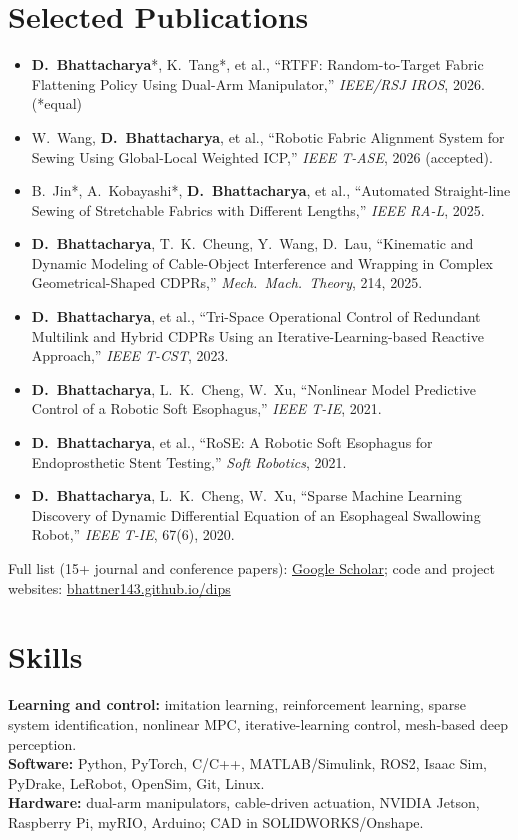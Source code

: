 \documentclass[10pt,a4paper]{article}
\newcommand{\pub}[1]{\item #1}
\begin{document}
\section*{Selected Publications}
\small
\begin{itemize}[itemsep=0.15em]
  \pub{\textbf{D.~Bhattacharya}*, K.~Tang*, et al., ``RTFF: Random-to-Target Fabric Flattening Policy Using Dual-Arm Manipulator,'' \textit{IEEE/RSJ IROS}, 2026. (*equal)}
  \pub{W.~Wang, \textbf{D.~Bhattacharya}, et al., ``Robotic Fabric Alignment System for Sewing Using Global-Local Weighted ICP,'' \textit{IEEE T-ASE}, 2026 (accepted).}
  \pub{B.~Jin*, A.~Kobayashi*, \textbf{D.~Bhattacharya}, et al., ``Automated Straight-line Sewing of Stretchable Fabrics with Different Lengths,'' \textit{IEEE RA-L}, 2025.}
  \pub{\textbf{D.~Bhattacharya}, T.~K.~Cheung, Y.~Wang, D.~Lau, ``Kinematic and Dynamic Modeling of Cable-Object Interference and Wrapping in Complex Geometrical-Shaped CDPRs,'' \textit{Mech.\ Mach.\ Theory}, 214, 2025.}
  \pub{\textbf{D.~Bhattacharya}, et al., ``Tri-Space Operational Control of Redundant Multilink and Hybrid CDPRs Using an Iterative-Learning-based Reactive Approach,'' \textit{IEEE T-CST}, 2023.}
  \pub{\textbf{D.~Bhattacharya}, L.~K.~Cheng, W.~Xu, ``Nonlinear Model Predictive Control of a Robotic Soft Esophagus,'' \textit{IEEE T-IE}, 2021.}
  \pub{\textbf{D.~Bhattacharya}, et al., ``RoSE: A Robotic Soft Esophagus for Endoprosthetic Stent Testing,'' \textit{Soft Robotics}, 2021.}
  \pub{\textbf{D.~Bhattacharya}, L.~K.~Cheng, W.~Xu, ``Sparse Machine Learning Discovery of Dynamic Differential Equation of an Esophageal Swallowing Robot,'' \textit{IEEE T-IE}, 67(6), 2020.}
\end{itemize}
\normalsize
Full list (15+ journal and conference papers): \href{https://scholar.google.com/citations?user=4BBRfsMAAAAJ\&hl=en}{Google Scholar}; code and project websites: \href{https://bhattner143.github.io/dips/}{bhattner143.github.io/dips}

\section*{Skills}
\textbf{Learning and control:} imitation learning, reinforcement learning, sparse system identification, nonlinear MPC, iterative-learning control, mesh-based deep perception.\\
\textbf{Software:} Python, PyTorch, C/C++, MATLAB/Simulink, ROS2, Isaac Sim, PyDrake, LeRobot, OpenSim, Git, Linux.\\
\textbf{Hardware:} dual-arm manipulators, cable-driven actuation, NVIDIA Jetson, Raspberry Pi, myRIO, Arduino; CAD in SOLIDWORKS/Onshape.
\end{document}
